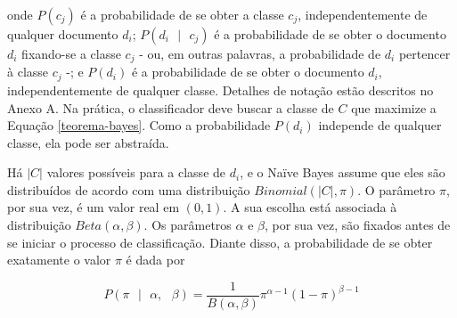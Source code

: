 onde \ensuremath{P(c_j)} é a probabilidade de se obter a classe \ensuremath{c_j}, independentemente de qualquer documento \ensuremath{d_i}; \ensuremath{P(d_i\mbox{ }|\mbox{ }c_j)} é a probabilidade de se obter o documento \ensuremath{d_i} fixando-se a classe \ensuremath{c_j} - ou, em outras palavras, a probabilidade de \ensuremath{d_i} pertencer à classe \ensuremath{c_j} -; e \ensuremath{P(d_i)} é a probabilidade de se obter o documento \ensuremath{d_i}, independentemente de qualquer classe. Detalhes de notação estão descritos no Anexo A. Na prática, o classificador deve buscar a classe de \ensuremath{C} que maximize a Equação \ref{teorema-bayes}.  Como a probabilidade \ensuremath{P(d_i)} independe de qualquer classe, ela pode ser abstraída. 






Há \ensuremath{|C|} valores possíveis para a classe de \ensuremath{d_i}, e o Naïve Bayes assume que eles são distribuídos de acordo com uma distribuição \ensuremath{Binomial(|C|, \pi)}. O parâmetro \ensuremath{\pi}, por sua vez, é um valor real em \ensuremath{(0,1)}. A sua escolha está associada à distribuição \ensuremath{Beta(\alpha, \beta)}. Os parâmetros \ensuremath{\alpha} e \ensuremath{\beta}, por sua vez, são fixados antes de se iniciar o processo de classificação. Diante disso, a probabilidade de se obter exatamente o valor \ensuremath{\pi} é dada por  \cite{resnik}





\begin{equation}
\label{beta}
\ensuremath{P(\pi\mbox{ }|\mbox{ } \alpha,\mbox{ }\beta) = \frac{1}{B(\alpha, \beta)}\pi^{\alpha - 1}(1 - \pi)^{\beta - 1}}
\end{equation}

